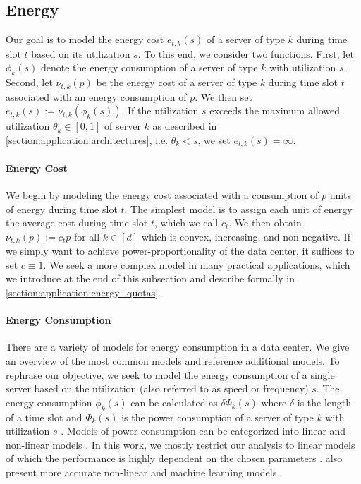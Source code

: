 \subsection{Energy}\label{section:application:operating_cost:energy}

Our goal is to model the energy cost $e_{t,k}(s)$ of a server of type $k$ during time slot $t$ based on its utilization $s$. To this end, we consider two functions. First, let $\phi_k(s)$ denote the energy consumption of a server of type $k$ with utilization $s$. Second, let $\nu_{t,k}(p)$ be the energy cost of a server of type $k$ during time slot $t$ associated with an energy consumption of $p$. We then set $e_{t,k}(s) := \nu_{t,k}(\phi_k(s))$. If the utilization $s$ exceeds the maximum allowed utilization $\theta_k \in [0,1]$ of server $k$ as described in \autoref{section:application:architectures}, i.e. $\theta_k < s$, we set $e_{t,k}(s) = \infty$.

\paragraph{Energy Cost} We begin by modeling the energy cost associated with a consumption of $p$ units of energy during time slot $t$. The simplest model is to assign each unit of energy the average cost during time slot $t$, which we call $c_t$. We then obtain $\nu_{t,k}(p) := c_t p$ for all $k \in [d]$ which is convex, increasing, and non-negative. If we simply want to achieve power-proportionality of the data center, it suffices to set $c \equiv 1$. We seek a more complex model in many practical applications, which we introduce at the end of this subsection and describe formally in \autoref{section:application:energy_quotas}.

\paragraph{Energy Consumption} There are a variety of models for energy consumption in a data center. We give an overview of the most common models and reference additional models. To rephrase our objective, we seek to model the energy consumption of a single server based on the utilization (also referred to as speed or frequency) $s$. The energy consumption $\phi_k(s)$ can be calculated as $\delta \Phi_k(s)$ where $\delta$ is the length of a time slot and $\Phi_k(s)$ is the power consumption of a server of type $k$ with utilization $s$ \cite{Dayarathna2016}. Models of power consumption can be categorized into linear and non-linear models \cite{Ismail2020}. In this work, we mostly restrict our analysis to linear models of which the performance is highly dependent on the chosen parameters \cite{Ismail2020}. \citeauthor*{Ismail2020} also present more accurate non-linear and machine learning models \cite{Ismail2020}.

